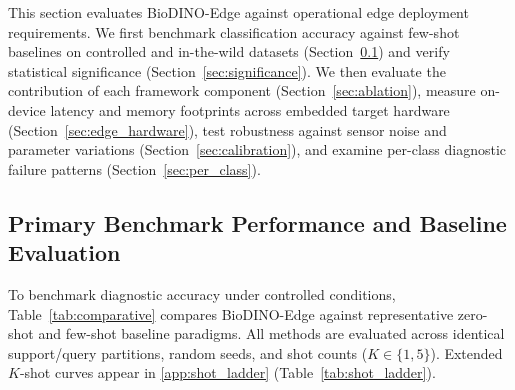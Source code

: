 \documentclass[preprint,12pt]{elsarticle}
\begin{document}
This section evaluates BioDINO-Edge against operational edge deployment requirements. We first benchmark classification accuracy against few-shot baselines on controlled and in-the-wild datasets (Section~\ref{sec:comparative_results}) and verify statistical significance (Section~\ref{sec:significance}). We then evaluate the contribution of each framework component (Section~\ref{sec:ablation}), measure on-device latency and memory footprints across embedded target hardware (Section~\ref{sec:edge_hardware}), test robustness against sensor noise and parameter variations (Section~\ref{sec:calibration}), and examine per-class diagnostic failure patterns (Section~\ref{sec:per_class}).

\subsection{Primary Benchmark Performance and Baseline Evaluation}
\label{sec:comparative_results}

To benchmark diagnostic accuracy under controlled conditions, Table~\ref{tab:comparative} compares BioDINO-Edge against representative zero-shot and few-shot baseline paradigms. All methods are evaluated across identical support/query partitions, random seeds, and shot counts ($K \in \{1, 5\}$). Extended $K$-shot curves appear in \ref{app:shot_ladder} (Table~\ref{tab:shot_ladder}).
\end{document}
